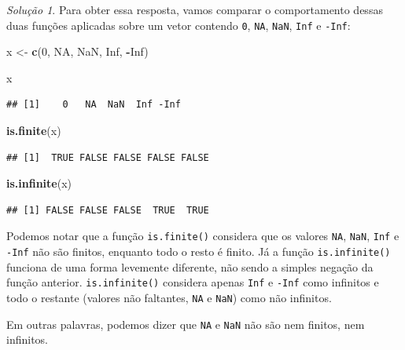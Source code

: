 \documentclass[
]{latex/krantz}
\newenvironment{Shaded}{\begin{snugshade}}{\end{snugshade}}
\newcommand{\ConstantTok}[1]{\textcolor[rgb]{0.56,0.35,0.01}{#1}}
\newcommand{\DecValTok}[1]{\textcolor[rgb]{0.00,0.00,0.81}{#1}}
\newcommand{\FunctionTok}[1]{\textcolor[rgb]{0.13,0.29,0.53}{\textbf{#1}}}
\newcommand{\NormalTok}[1]{#1}
\newcommand{\OtherTok}[1]{\textcolor[rgb]{0.56,0.35,0.01}{#1}}
\newcommand{\SpecialCharTok}[1]{\textcolor[rgb]{0.81,0.36,0.00}{\textbf{#1}}}
\theoremstyle{definition}
\theoremstyle{definition}
\theoremstyle{definition}
\theoremstyle{definition}
\theoremstyle{remark}
\newtheorem*{solution}{Solução}
\begin{document}
\begin{solution}
Para obter essa resposta, vamos comparar o comportamento dessas duas funções aplicadas sobre um vetor contendo \texttt{0}, \texttt{NA}, \texttt{NaN}, \texttt{Inf} e \texttt{-Inf}:

\begin{Shaded}
\begin{Highlighting}[]
\NormalTok{x }\OtherTok{\textless{}{-}} \FunctionTok{c}\NormalTok{(}\DecValTok{0}\NormalTok{, }\ConstantTok{NA}\NormalTok{, }\ConstantTok{NaN}\NormalTok{, }\ConstantTok{Inf}\NormalTok{, }\SpecialCharTok{{-}}\ConstantTok{Inf}\NormalTok{)}

\NormalTok{x}
\end{Highlighting}
\end{Shaded}

\begin{verbatim}
## [1]    0   NA  NaN  Inf -Inf
\end{verbatim}

\begin{Shaded}
\begin{Highlighting}[]
\FunctionTok{is.finite}\NormalTok{(x)}
\end{Highlighting}
\end{Shaded}

\begin{verbatim}
## [1]  TRUE FALSE FALSE FALSE FALSE
\end{verbatim}

\begin{Shaded}
\begin{Highlighting}[]
\FunctionTok{is.infinite}\NormalTok{(x)}
\end{Highlighting}
\end{Shaded}

\begin{verbatim}
## [1] FALSE FALSE FALSE  TRUE  TRUE
\end{verbatim}

Podemos notar que a função \texttt{is.finite()} considera que os valores \texttt{NA}, \texttt{NaN}, \texttt{Inf} e \texttt{-Inf} não são finitos, enquanto todo o resto é finito. Já a função \texttt{is.infinite()} funciona de uma forma levemente diferente, não sendo a simples negação da função anterior. \texttt{is.infinite()} considera apenas \texttt{Inf} e \texttt{-Inf} como infinitos e todo o restante (valores não faltantes, \texttt{NA} e \texttt{NaN}) como não infinitos.

Em outras palavras, podemos dizer que \texttt{NA} e \texttt{NaN} não são nem finitos, nem infinitos.
\end{solution}
\end{document}
